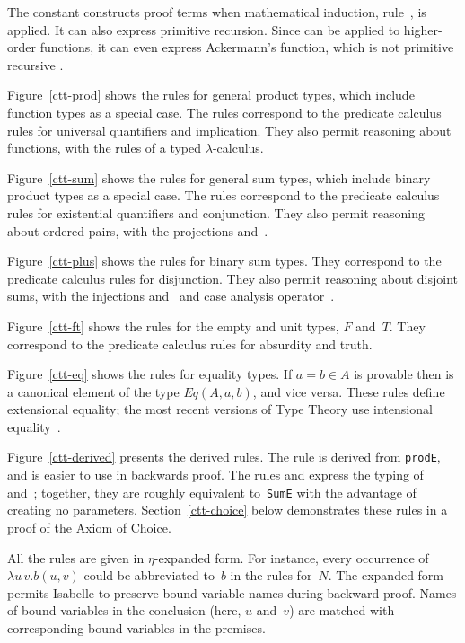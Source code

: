 The constant  constructs proof terms when mathematical
induction, rule~, is applied.  It can also express primitive
recursion.  Since  can be applied to higher-order functions,
it can even express Ackermann's function, which is not primitive recursive
\cite[page~104]{thompson91}.

Figure~\ref{ctt-prod} shows the rules for general product types, which
include function types as a special case.  The rules correspond to the
predicate calculus rules for universal quantifiers and implication.  They
also permit reasoning about functions, with the rules of a typed
$\lambda$-calculus.

Figure~\ref{ctt-sum} shows the rules for general sum types, which
include binary product types as a special case.  The rules correspond to the
predicate calculus rules for existential quantifiers and conjunction.  They
also permit reasoning about ordered pairs, with the projections
 and~.

Figure~\ref{ctt-plus} shows the rules for binary sum types.  They
correspond to the predicate calculus rules for disjunction.  They also
permit reasoning about disjoint sums, with the injections 
and~ and case analysis operator~.

Figure~\ref{ctt-ft} shows the rules for the empty and unit types, $F$
and~$T$.  They correspond to the predicate calculus rules for absurdity and
truth.

Figure~\ref{ctt-eq} shows the rules for equality types.  If $a=b\in A$ is
provable then  is a canonical element of the type $Eq(A,a,b)$,
and vice versa.  These rules define extensional equality; the most recent
versions of Type Theory use intensional equality~\cite{nordstrom90}.

Figure~\ref{ctt-derived} presents the derived rules.  The rule
 is derived from {\tt prodE}, and is easier to use
in backwards proof.  The rules  and 
express the typing of~ and~; together, they are
roughly equivalent to~{\tt SumE} with the advantage of creating no
parameters.  Section~\ref{ctt-choice} below demonstrates these rules in a
proof of the Axiom of Choice.

All the rules are given in $\eta$-expanded form.  For instance, every
occurrence of $\lambda u\,v.b(u,v)$ could be abbreviated to~$b$ in the
rules for~$N$.  The expanded form permits Isabelle to preserve bound
variable names during backward proof.  Names of bound variables in the
conclusion (here, $u$ and~$v$) are matched with corresponding bound
variables in the premises.


